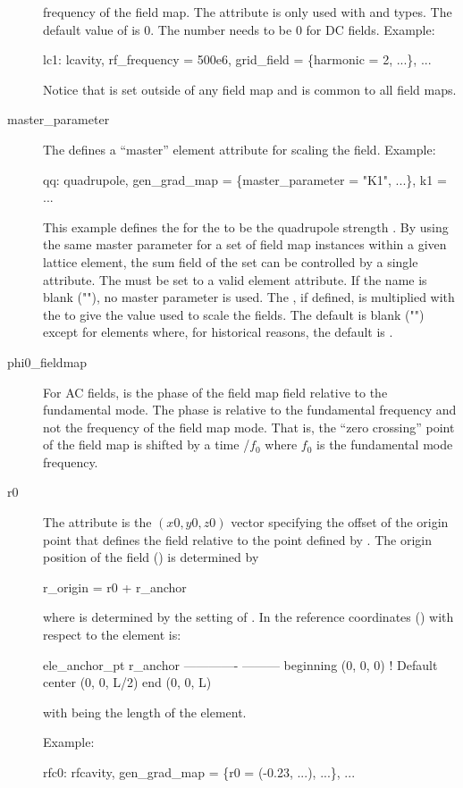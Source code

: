 \begin{description}
frequency of the field map. The  attribute is only used with  and
 types. The default value of  is 0.  The  number needs to
be 0 for DC fields. Example:
\begin{example}
  lc1: lcavity, rf_frequency = 500e6, grid_field = \{harmonic = 2, ...\}, ...
\end{example}
Notice that  is set outside of any field map and is common to all field maps.
  \item[master_parameter] \Newline
The  defines a ``master'' element attribute for scaling the field. Example:
\begin{example}
  qq: quadrupole, gen_grad_map = \{master_parameter = "K1", ...\}, k1 = ...
\end{example}
This example defines the  for the  to be the
quadrupole strength . By using the same master parameter for a set of field map
instances within a given lattice element, the sum field of the set can be controlled by a
single attribute. The  must be set to a valid element attribute. If
the name is blank (""), no master parameter is used. The , if
defined, is multiplied with the  to give the value used to scale the
fields. The default  is blank ("") except for  elements
where, for historical reasons, the default is .
%
\item[phi0_fieldmap] \Newline
For AC fields,  is the phase of the field map field relative to the fundamental
mode. The phase  is relative to the fundamental frequency and not the frequency of
the field map mode. That is, the ``zero crossing'' point of the field map is shifted by a time
/$f_0$ where $f_0$ is the fundamental mode frequency.
%
\item[r0] \Newline
The  attribute is the $(x0, y0, z0)$ vector specifying the offset of the origin point that
defines the field relative to the  point defined by .  The origin
position of the field () is determined by
\begin{example}
  r_origin = r0 + r_anchor
\end{example}
where  is determined by the setting of . In the reference
coordinates () with respect to the element  is:
\begin{example}
  ele_anchor_pt       r_anchor
  -------------       ---------
  beginning           (0, 0, 0)      ! Default
  center              (0, 0, L/2)
  end                 (0, 0, L)
\end{example}
with  being the length of the element. 

Example:
\begin{example}
  rfc0: rfcavity, gen_grad_map = \{r0 = (-0.23, ...), ...\}, ...
\end{example}
  \end{description}


